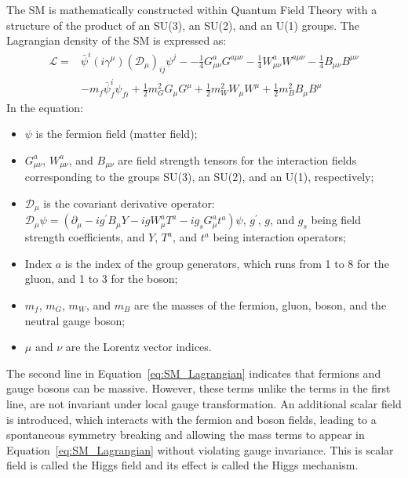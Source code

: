 The SM is mathematically constructed within Quantum Field Theory with a structure of the product of an SU(3), an SU(2), and an U(1) groups.
The Lagrangian density of the SM is expressed as:
\begin{equation}\label{eq:SM_Lagrangian}
  \begin{split}
    \mathcal{L} = & \bar{\psi}^{i} (i\gamma^{\mu})(\mathcal{D}_{\mu})_{ij}\psi^{j} -
                  - \frac{1}{4} G^{a}_{\mu\nu}G^{a\mu\nu}
                  - \frac{1}{4} W^{a}_{\mu\nu}W^{a\mu\nu}
                  - \frac{1}{4} B_{\mu\nu}B^{\mu\nu} \\
                & - m_{f} \bar{\psi}^{i}_{f} \psi_{fi}
                  + \frac{1}{2} m^{2}_{G} G_{\mu}G^{\mu}
                  + \frac{1}{2} m^{2}_{W} W_{\mu}W^{\mu}
                  + \frac{1}{2} m^{2}_{B} B_{\mu}B^{\mu}
  \end{split}
\end{equation}
In the equation:
\begin{itemize}
  \item $\psi$ is the fermion field (matter field);
  \item $G^{a}_{\mu\nu}$, $W^{a}_{\mu\nu}$, and $B_{\mu\nu}$ are field strength tensors for the interaction fields 
        corresponding to the groups SU(3), an SU(2), and an U(1), respectively;
  \item $\mathcal{D}_{\mu}$ is the covariant derivative operator: $\mathcal{D}_{\mu}\psi = (\partial_{\mu} - ig^{\prime}B_{\mu}Y - igW^{a}_{\mu}T^{a} - ig_{s}G^{a}_{\mu}t^{a})\psi$,
        $g^{\prime}$, $g$, and $g_{s}$ being field strength coefficients, and $Y$, $T^{a}$, and $t^{a}$ being interaction operators;
  \item Index $a$ is the index of the group generators, which runs from 1 to 8 for the gluon, and 1 to 3 for the \PW boson;
  \item $m_{f}$, $m_{G}$, $m_{W}$, and $m_{B}$ are the masses of the fermion, gluon, \PW boson, and the neutral gauge boson;
  \item $\mu$ and $\nu$ are the Lorentz vector indices.
\end{itemize}

The second line in Equation~\ref{eq:SM_Lagrangian} indicates that fermions and gauge bosons can be massive.
However, these terms unlike the terms in the first line, are not invariant under local gauge transformation.
An additional scalar field is introduced, which interacts with the fermion and boson fields,
leading to a spontaneous symmetry breaking and allowing the mass terms to appear in Equation~\ref{eq:SM_Lagrangian} without violating gauge invariance.
This is scalar field is called the Higgs field and its effect is called the Higgs mechanism.

